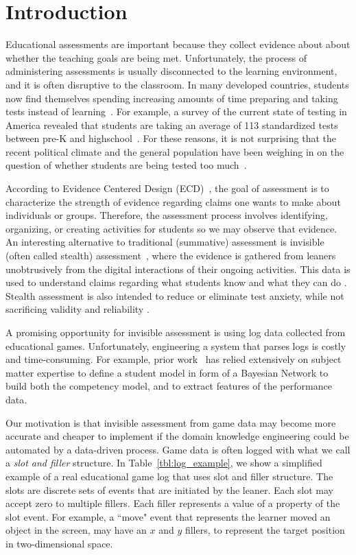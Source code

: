 \documentclass{sigchi}
\begin{document}
\section{Introduction}
Educational assessments are important because they collect evidence about about  whether  the teaching goals are being met.
Unfortunately, the process of  administering assessments is usually disconnected to the learning environment, and  it is often  disruptive to the classroom. 
In many developed countries, students now find themselves spending increasing amounts of time preparing and taking tests instead of learning~\cite{hofman2015rebalancing}.
For example, a  survey of the current state of testing in America revealed that students are taking an average of 113 standardized tests between pre-K and highschool~\cite{lazarin2014testing}. 
For these reasons, it is not surprising that the recent political climate and the general population have been weighing in on the question of whether students are being tested too much~\cite{lazarin2014testing}.


According to Evidence Centered Design (ECD)~\cite{mislevy2012design}, the goal of assessment is to characterize the strength of evidence regarding claims one wants to make about individuals or groups.
Therefore, the assessment process involves identifying, organizing, or creating activities for students so we may observe that evidence.
An interesting alternative to traditional (summative) assessment is invisible (often called stealth) assessment~\cite{shute2013stealth},
where the evidence is gathered from leaners unobtrusively from the digital interactions of their ongoing activities.
This data is used  to understand claims regarding what students know and what they can do \cite{shute2009melding}.
Stealth assessment is also intended to reduce or eliminate test anxiety, while not sacrificing validity and reliability \cite{shute2008you}.



A promising opportunity for invisible assessment is using log data collected from educational games.
Unfortunately, engineering a system that parses logs is costly and time-consuming.
For example, prior work~\cite{shute2013stealth, shute2009melding} has relied extensively on subject matter expertise to define a student model in form of a  Bayesian Network to build both the competency model, and to extract features of the performance data.

Our motivation is that invisible assessment from game data may become more accurate and cheaper to implement if the domain knowledge engineering could be automated by a data-driven process.
Game data is often logged  with what we call a \textit{slot and filler} structure.
In Table~\ref{tbl:log_example}, we show a simplified example of a real educational game log that uses slot and filler structure.
The slots are discrete sets of events that are initiated by the leaner.
Each slot may accept zero to multiple fillers. 
Each filler represents a value of a property of the slot event.
For example, a ``move" event  that represents the learner moved an object in the screen, may have an $x$ and $y$ fillers, to represent the target position in two-dimensional space.
\end{document}
